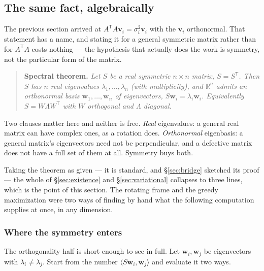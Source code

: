\documentclass[11pt]{article}
\numberwithin{equation}{section}
\newcommand{\R}{\mathbb{R}}
\newcommand{\T}{^{\mathsf{T}}}
\newcommand{\ip}[2]{\langle #1, #2 \rangle}
\newcommand{\vv}[1]{\mathbf{v}_{#1}}
\theoremstyle{plainish}
\begin{document}
\subsection{The same fact, algebraically}
\label{sec:algebraic}

The previous section arrived at $A\T A \vv i = \sigma_i^2 \vv i$ with the
$\vv i$ orthonormal. That statement has a name, and stating it for a general
symmetric matrix rather than for $A\T A$ costs nothing --- the hypothesis that
actually does the work is symmetry, not the particular form of the matrix.

\begin{quote}
\textbf{Spectral theorem.} \itshape Let $S$ be a real symmetric $n \times n$
matrix, $S = S\T$. Then $S$ has $n$ real eigenvalues $\lambda_1, \dots,
\lambda_n$ (with multiplicity), and $\R^n$ admits an \emph{orthonormal} basis
$\mathbf{w}_1, \dots, \mathbf{w}_n$ of eigenvectors, $S\mathbf{w}_i = \lambda_i
\mathbf{w}_i$. Equivalently $S = W \Lambda W\T$ with $W$ orthogonal and
$\Lambda$ diagonal.
\end{quote}

\noindent
Two clauses matter here and neither is free. \emph{Real} eigenvalues: a general
real matrix can have complex ones, as a rotation does. \emph{Orthonormal}
eigenbasis: a general matrix's eigenvectors need not be perpendicular, and a
defective matrix does not have a full set of them at all. Symmetry buys both.

Taking the theorem as given --- it is standard, and \S\ref{sec:bridge} sketched
its proof --- the whole of \S\ref{sec:existence} and \S\ref{sec:variational}
collapses to three lines, which is the point of this section. The rotating frame
and the greedy maximization were two ways of finding by hand what the following
computation supplies at once, in any dimension.

\subsubsection*{Where the symmetry enters}

The orthogonality half is short enough to see in full. Let $\mathbf{w}_i,
\mathbf{w}_j$ be eigenvectors with $\lambda_i \neq \lambda_j$. Start from the
number $\ip{S\mathbf{w}_i}{\mathbf{w}_j}$ and evaluate it two ways.
\end{document}
